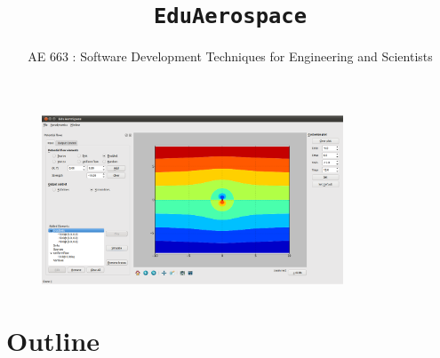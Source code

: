 \documentclass{beamer}
\title{\texttt{EduAerospace}}
\subtitle{AE 663 : Software Development Techniques for Engineering and Scientists}
\date{\empty}
\begin{document}
\begin{frame}[label = Titlepage]
	\titlepage
	\vspace*{-3cm}
	\begin{figure}
		\centering
		\includegraphics[width=0.8\textwidth]{Images/pic2.png}
	\end{figure}
\end{frame}

\section{Outline}
\begin{frame}[label = toc]
	\tableofcontents[pausesections]
\end{frame}

\end{document}
